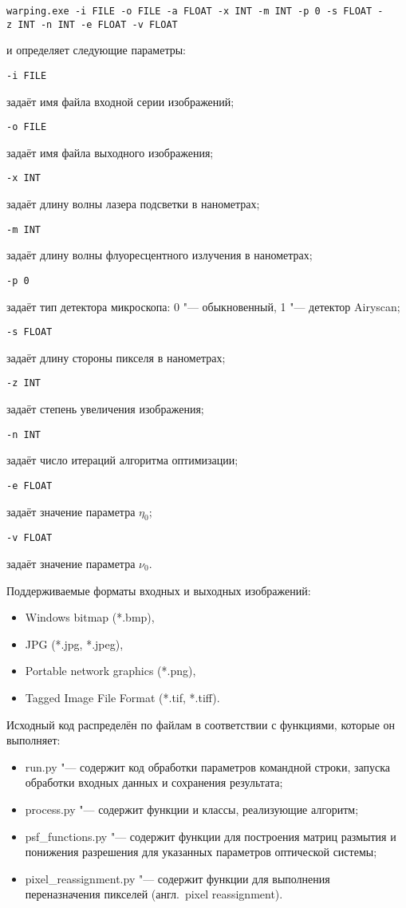 \texttt{warping.exe -i~FILE -o~FILE -a~FLOAT -x~INT -m~INT -p~0 -s~FLOAT -z~INT -n~INT -e~FLOAT -v FLOAT}

\noindent и определяет следующие параметры:

\noindent \texttt{-i~FILE}

задаёт имя файла входной серии изображений;

\noindent \texttt{-o~FILE}

задаёт имя файла выходного изображения;

\noindent \texttt{-x~INT}

задаёт длину волны лазера подсветки в нанометрах;

\noindent \texttt{-m~INT}

задаёт длину волны флуоресцентного излучения в нанометрах;

\noindent \texttt{-p~0}

задаёт тип детектора микроскопа: 0 "--- обыкновенный, 1 "--- детектор Airyscan;

\noindent \texttt{-s~FLOAT}

задаёт длину стороны пикселя в нанометрах;

\noindent \texttt{-z~INT}

задаёт степень увеличения изображения;

\noindent \texttt{-n~INT}

задаёт число итераций алгоритма оптимизации;

\noindent \texttt{-e~FLOAT}

задаёт значение параметра $\eta_0$;

\noindent \texttt{-v~FLOAT}

задаёт значение параметра $\nu_0$.

Поддерживаемые форматы входных и выходных изображений:

\begin{itemize}[beginpenalty=10000]
	\item Windows bitmap (*.bmp),
	\item JPG (*.jpg, *.jpeg),
	\item Portable network graphics (*.png),
	\item Tagged Image File Format (*.tif, *.tiff).
\end{itemize}

Исходный код распределён по файлам в соответствии с функциями, которые он выполняет:

\begin{itemize}[beginpenalty=10000]
	\item run.py "--- содержит код обработки параметров командной строки, запуска обработки входных данных и сохранения результата;
	\item process.py "--- содержит функции и классы, реализующие алгоритм;
	\item psf\_functions.py "--- содержит функции для построения матриц размытия и понижения разрешения для указанных параметров оптической системы;
	\item pixel\_reassignment.py "--- содержит функции для выполнения переназначения пикселей (англ.~pixel reassignment).
\end{itemize}

